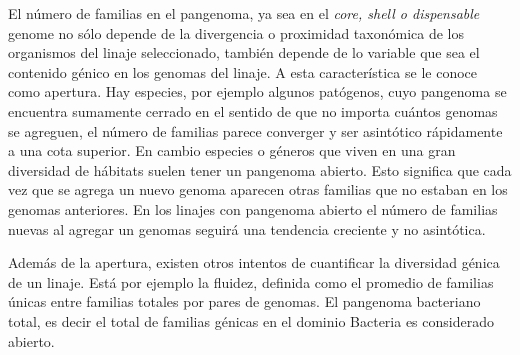 \documentclass[]{article}
\begin{document}
El número de familias en el pangenoma, ya sea en el \emph{core, shell o
dispensable} genome no sólo depende de la divergencia o proximidad
taxonómica de los organismos del linaje seleccionado, también depende de
lo variable que sea el contenido génico en los genomas del linaje. A
esta característica se le conoce como apertura. Hay especies, por
ejemplo algunos patógenos, cuyo pangenoma se encuentra sumamente cerrado
en el sentido de que no importa cuántos genomas se agreguen, el número
de familias parece converger y ser asintótico rápidamente a una cota
superior. En cambio especies o géneros que viven en una gran diversidad
de hábitats suelen tener un pangenoma abierto. Esto significa que cada
vez que se agrega un nuevo genoma aparecen otras familias que no estaban
en los genomas anteriores. En los linajes con pangenoma abierto el
número de familias nuevas al agregar un genomas seguirá una tendencia
creciente y no asintótica.

Además de la apertura, existen otros intentos de cuantificar la
diversidad génica de un linaje. Está por ejemplo la fluidez, definida
como el promedio de familias únicas entre familias totales por pares de
genomas. El pangenoma bacteriano total, es decir el total de familias
génicas en el dominio Bacteria es considerado abierto.
\end{document}
